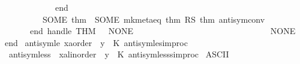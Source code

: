 \begin{isabellebody}
\ \ \ \ \ \ \ \ \ \ \ \ end\isanewline
\ \ \ \ \ \ \ \ {\isacharbar}{\kern0pt}\ SOME\ thm\ {\isacharequal}{\kern0pt}{\isachargreater}{\kern0pt}\ SOME\ {\isacharparenleft}{\kern0pt}mk{\isacharunderscore}{\kern0pt}meta{\isacharunderscore}{\kern0pt}eq\ {\isacharparenleft}{\kern0pt}thm\ RS\ {\isacharat}{\kern0pt}{\isacharbraceleft}{\kern0pt}thm\ antisym{\isacharunderscore}{\kern0pt}conv{}{\isacharbraceright}{\kern0pt}{\isacharparenright}{\kern0pt}{\isacharparenright}{\kern0pt}{\isacharparenright}{\kern0pt}\isanewline
\ \ \ \ \ \ end\ handle\ THM\ {\isacharunderscore}{\kern0pt}\ {\isacharequal}{\kern0pt}{\isachargreater}{\kern0pt}\ NONE{\isacharparenright}{\kern0pt}\ \ \ \ \ \ \ \ \ \ \ \ \ \ \ \ \ \ \ \ \ \ \ \ \ \ \ \isanewline
\ \ {\isacharbar}{\kern0pt}\ {\isacharunderscore}{\kern0pt}\ {\isacharequal}{\kern0pt}{\isachargreater}{\kern0pt}\ NONE{\isacharparenright}{\kern0pt}{\isacharsemicolon}{\kern0pt}\isanewline
\isanewline
end{\isacharsemicolon}{\kern0pt}\isanewline
{\isacartoucheclose}\isanewline
\isanewline
{}\isamarkupfalse%
\ antisym{\isacharunderscore}{\kern0pt}le\ {\isacharparenleft}{\kern0pt}{\isachardoublequoteopen}{\isacharparenleft}{\kern0pt}x{\isacharcolon}{\kern0pt}{\isacharcolon}{\kern0pt}{\isacharprime}{\kern0pt}a{\isacharcolon}{\kern0pt}{\isacharcolon}{\kern0pt}order{\isacharparenright}{\kern0pt}\ {\isasymle}\ y{\isachardoublequoteclose}{\isacharparenright}{\kern0pt}\ {\isacharequal}{\kern0pt}\ {\isachardoublequoteopen}K\ antisym{\isacharunderscore}{\kern0pt}le{\isacharunderscore}{\kern0pt}simproc{\isachardoublequoteclose}\isanewline
{}\isamarkupfalse%
\ antisym{\isacharunderscore}{\kern0pt}less\ {\isacharparenleft}{\kern0pt}{\isachardoublequoteopen}{\isasymnot}\ {\isacharparenleft}{\kern0pt}x{\isacharcolon}{\kern0pt}{\isacharcolon}{\kern0pt}{\isacharprime}{\kern0pt}a{\isacharcolon}{\kern0pt}{\isacharcolon}{\kern0pt}linorder{\isacharparenright}{\kern0pt}\ {\isacharless}{\kern0pt}\ y{\isachardoublequoteclose}{\isacharparenright}{\kern0pt}\ {\isacharequal}{\kern0pt}\ {\isachardoublequoteopen}K\ antisym{\isacharunderscore}{\kern0pt}less{\isacharunderscore}{\kern0pt}simproc{\isachardoublequoteclose}%
\endisatagML
{\isafoldML}%
%
\isadelimML
%
\endisadelimML
%
\isadelimdocument
%
\endisadelimdocument
%
\isatagdocument
%
\isamarkuptrue%
%
\endisatagdocument
{\isafolddocument}%
%
\isadelimdocument
%
\endisadelimdocument
{}\isamarkupfalse%
\ {\isacharparenleft}{\kern0pt}ASCII{\isacharparenright}{\kern0pt}\isanewline

\end{isabellebody}
